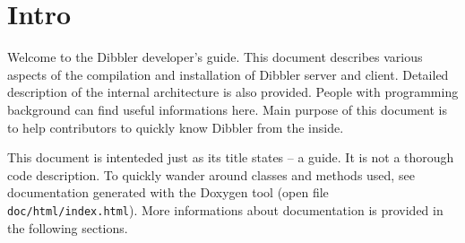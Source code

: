 
\section{Intro}
Welcome to the Dibbler developer's guide. This document describes
various aspects of the compilation and installation of Dibbler server
and client. Detailed description of the internal architecture is also
provided. People with programming background can find useful
informations here. Main purpose of this document is to help
contributors to quickly know Dibbler from the inside.

This document is intenteded just as its title states -- a guide. It is
not a thorough code description. To quickly wander around classes and
methods used, see documentation generated with the Doxygen tool (open
file \verb+doc/html/index.html+). More informations about
documentation is provided in the following sections.

